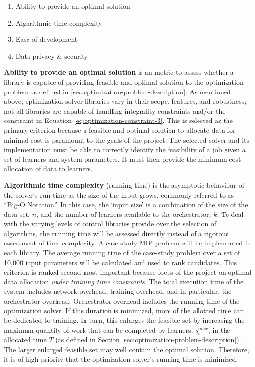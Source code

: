 \documentclass[../mthe-493-final-project.tex]{subfiles}
\begin{document}
    \begin{enumerate}
        \item Ability to provide an optimal solution
        \item Algorithmic time complexity
        \item Ease of development
        \item Data privacy \& security
    \end{enumerate}
    
    \textbf{Ability to provide an optimal solution} is an metric to assess whether a library is capable of providing feasible and optimal solution to the optimization problem as defined in \ref{sec:optimization-problem-description}. As mentioned above, optimization solver libraries vary in their scope, features, and robustness; not all libraries are capable of handling integrality constraints and/or the constraint in Equation \ref{eq:optimization-constraint-3}.
    This is selected as the primary criterion because a feasible and optimal solution to allocate data for minimal cost is paramount to the goals of the project. The selected solver and its implementation must be able to correctly identify the feasibility of a job given a set of learners and system parameters. It must then provide the minimum-cost allocation of data to learners.
    
    \textbf{Algorithmic time complexity} (running time) is the asymptotic behaviour of the solver's run time as the size of the input grows, commonly referred to as ``Big-O Notation''\cite{sipser_introduction_2013}. In this case, the `input size' is a combination of the size of the data set, $n$, and the number of learners available to the orchestrator, $k$. To deal with the varying levels of control libraries provide over the selection of algorithms, the running time will be assessed directly instead of a rigorous assessment of time complexity. A case-study MIP problem will be implemented in each library. The average running time of the case-study problem over a set of 10,000 input parameters will be calculated and used to rank candidates.
    This criterion is ranked second most-important because focus of the project on optimal data allocation \textit{under training time constraints}. The total execution time of the system includes network overhead, training overhead, and in particular, the orchestrator overhead. Orchestrator overhead includes the running time of the optimization solver. If this duration is minimized, more of the allotted time can be dedicated to training. In turn, this enlarges the feasible set by increasing the maximum quantity of work that can be completed by learners, $s^{max}_i$, in the allocated time $T$ (as defined in Section \ref{sec:optimization-problem-description}). The larger enlarged feasible set may well contain the optimal solution. Therefore, it is of high priority that the optimization solver's running time is minimized.
    
\end{document}
